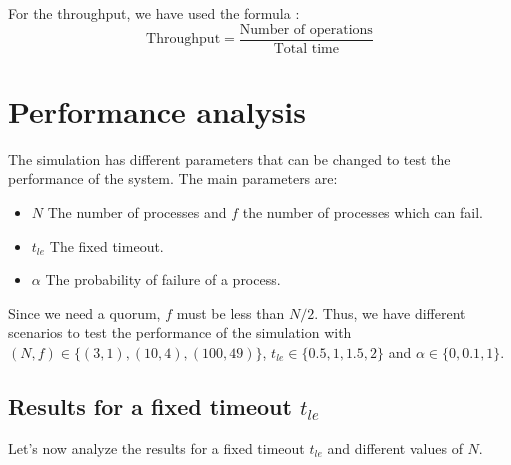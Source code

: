 \documentclass{article}
\begin{document}
For the throughput, we have used the formula :
$$
\text{Throughput} = \frac{\text{Number of operations}}{\text{Total time}}
$$

\newpage

\section{Performance analysis}
The simulation has different parameters that can be changed to test the performance of the system. The main parameters are:

\begin{itemize}
    \item $N$ The number of processes and $f$ the number of processes which can fail.
    \item $t_{le}$ The fixed timeout.
    \item $\alpha$ The probability of failure of a process.
\end{itemize}

Since we need a quorum, $f$ must be less than $N/2$. Thus,
we have different scenarios to test the performance of the simulation
with $(N,f) \in \{(3,1),(10,4),(100,49)\}$, $t_{le} \in \{0.5,1,1.5,2\}$ and $\alpha \in \{0,0.1,1\}$.

\subsection{Results for a fixed timeout $t_{le}$}
Let's now analyze the results for a fixed timeout $t_{le}$ and different values of $N$.
\end{document}
